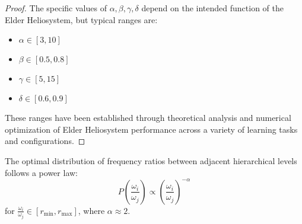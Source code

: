 \begin{proof}
The specific values of $\alpha, \beta, \gamma, \delta$ depend on the intended function of the Elder Heliosystem, but typical ranges are:
\begin{itemize}
    \item $\alpha \in [3, 10]$
    \item $\beta \in [0.5, 0.8]$
    \item $\gamma \in [5, 15]$
    \item $\delta \in [0.6, 0.9]$
\end{itemize}

These ranges have been established through theoretical analysis and numerical optimization of Elder Heliosystem performance across a variety of learning tasks and configurations.
\end{proof}

\begin{theorem}
The optimal distribution of frequency ratios between adjacent hierarchical levels follows a power law:
\begin{equation}
P\left(\frac{\omega_i}{\omega_j}\right) \propto \left(\frac{\omega_i}{\omega_j}\right)^{-\alpha}
\end{equation}
for $\frac{\omega_i}{\omega_j} \in [r_{\min}, r_{\max}]$, where $\alpha \approx 2$.
\end{theorem}

